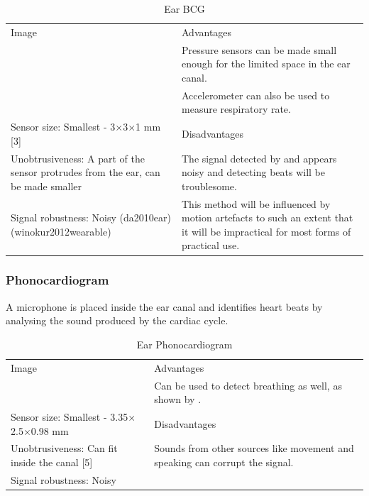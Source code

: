 \begin{table}[H]
\caption{Ear BCG}
\label{tab:EarBCG_Eval}
\renewcommand{\arraystretch}{1.3}	%
\centering
\begin{tabular}{|p{5cm}|p{8cm}|} 
 \hline
 Image 		& 	Advantages  \\ 
  			&	\tabitem Pressure sensors can be made small enough for the limited space in the ear canal.\\
  			&	\tabitem Accelerometer can also be used to measure respiratory rate.\\
\hline
Sensor size: Smallest - 3$\times$3$\times$1 mm	[3]									&	Disadvantages  \\ 
Unobtrusiveness: A part of the sensor protrudes from the ear, can be made smaller 	&	\tabitem The signal detected by \cite{da2010ear} and \cite{winokur2012wearable} appears noisy and detecting beats will be troublesome.\\
Signal robustness: Noisy (da2010ear) (winokur2012wearable) 							&	\tabitem This method will be influenced by motion artefacts to such an extent that it will be impractical for most forms of practical use.\\
 
 \hline
\end{tabular}
\end{table}

\subsubsection{Phonocardiogram}
A microphone is placed inside the ear canal and identifies heart beats by analysing the sound produced by the cardiac cycle.

\begin{table}[H]
\caption{Ear Phonocardiogram}
\label{tab:EarPhonocardiogram_Eval}
\renewcommand{\arraystretch}{1.3}	%
\centering
\begin{tabular}{|p{5cm}|p{8cm}|} 
 \hline
 Image 		& 	Advantages  \\ 
  			&	\tabitem Can be used to detect breathing as well, as shown by \cite{goverdovsky2016hearables}.\\
\hline
Sensor size: Smallest - 3.35$\times$2.5$\times$0.98 mm	&	Disadvantages  \\ 
Unobtrusiveness: Can fit inside the canal [5]			&	\tabitem Sounds from other sources like movement and speaking can corrupt the signal.\\
Signal robustness: Noisy 								&	\\
 
 \hline
\end{tabular}
\end{table}


